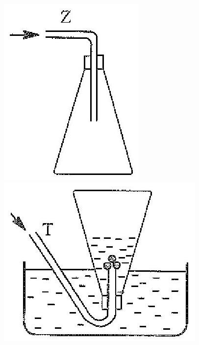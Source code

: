 \documentclass[10pt]{article}
\begin{document}
\includegraphics[max width=\textwidth, center]{2025_10_23_fa9073eecee116ad8cf2g-15}\\
\includegraphics[max width=\textwidth, center]{2025_10_23_fa9073eecee116ad8cf2g-15(2)}
\end{document}
